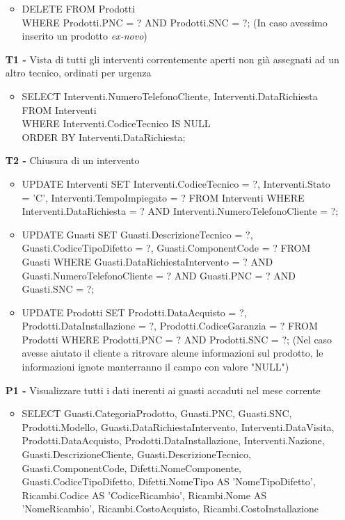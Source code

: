 \documentclass[a4paper, 12pt]{report}
\begin{document}
\begin{itemize}
\begin{itemize}[leftmargin=*, topsep=0pt]
			\item DELETE FROM Prodotti \\WHERE Prodotti.PNC = ? AND Prodotti.SNC = ?;
				\subitem (In caso avessimo inserito un prodotto \textit{ex-novo})			
		\end{itemize}
	\item[\textbf{T1 -}] Vista di tutti gli interventi correntemente aperti non già assegnati ad un altro tecnico, ordinati per urgenza
		\begin{itemize}[leftmargin=*, topsep=0pt]
			\item SELECT Interventi.NumeroTelefonoCliente, Interventi.DataRichiesta\\
			FROM Interventi\\
			WHERE Interventi.CodiceTecnico IS NULL\\
			ORDER BY Interventi.DataRichiesta;
		\end{itemize}
	\item[\textbf{T2 -}] Chiusura di un intervento
		\begin{itemize}[leftmargin=*, topsep=0pt]
			\item UPDATE Interventi SET Interventi.CodiceTecnico = ?, Interventi.Stato = 'C', Interventi.TempoImpiegato = ? FROM Interventi WHERE Interventi.DataRichiesta = ? AND Interventi.NumeroTelefonoCliente = ?;\newline
			\item UPDATE Guasti SET Guasti.DescrizioneTecnico = ?, Guasti.CodiceTipoDifetto = ?, Guasti.ComponentCode = ? FROM Guasti WHERE Guasti.DataRichiestaIntervento = ? AND Guasti.NumeroTelefonoCliente = ? AND Guasti.PNC = ? AND Guasti.SNC = ?;\newline
			\item UPDATE Prodotti SET Prodotti.DataAcquisto = ?, Prodotti.DataInstallazione = ?, Prodotti.CodiceGaranzia = ? FROM Prodotti WHERE Prodotti.PNC = ? AND Prodotti.SNC = ?;
				\subitem (Nel caso avesse aiutato il cliente a ritrovare alcune informazioni sul prodotto, le informazioni ignote manterranno il campo con valore "NULL")
		\end{itemize}
	\newpage
	\item[\textbf{P1 -}] Visualizzare tutti i dati inerenti ai guasti accaduti nel mese corrente
		\begin{itemize}[leftmargin=*, topsep=0pt]
			\item SELECT Guasti.CategoriaProdotto, Guasti.PNC, Guasti.SNC, Prodotti.Modello, Guasti.DataRichiestaIntervento, Interventi.DataVisita, Prodotti.DataAcquisto, Prodotti.DataInstallazione, Interventi.Nazione, Guasti.DescrizioneCliente, Guasti.DescrizioneTecnico, Guasti.ComponentCode, Difetti.NomeComponente, Guasti.CodiceTipoDifetto, Difetti.NomeTipo AS 'NomeTipoDifetto', Ricambi.Codice AS 'CodiceRicambio', Ricambi.Nome AS 'NomeRicambio', Ricambi.CostoAcquisto, Ricambi.CostoInstallazione\\

\end{itemize}
\end{itemize}
\end{document}
